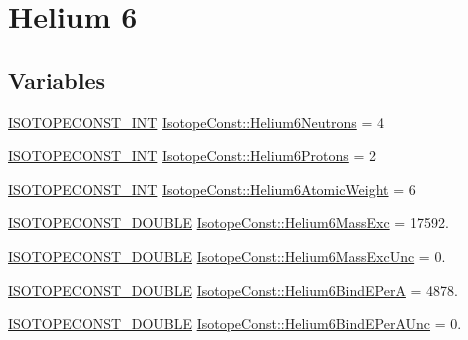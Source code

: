 \hypertarget{group___isotope_const-_helium-_he6}{}\section{Helium 6}
\label{group___isotope_const-_helium-_he6}
\subsection*{Variables}
\begin{DoxyCompactItemize}
\item 
\mbox{\hyperlink{group___isotope_const-_macros_ga5f18360b3e99483a35c32d789e62621c}{I\+S\+O\+T\+O\+P\+E\+C\+O\+N\+S\+T\+\_\+\+I\+NT}} \mbox{\hyperlink{group___isotope_const-_helium-_he6_ga86f644d7cf011f88558f20e694b5bb42}{Isotope\+Const\+::\+Helium6\+Neutrons}} = 4
\item 
\mbox{\hyperlink{group___isotope_const-_macros_ga5f18360b3e99483a35c32d789e62621c}{I\+S\+O\+T\+O\+P\+E\+C\+O\+N\+S\+T\+\_\+\+I\+NT}} \mbox{\hyperlink{group___isotope_const-_helium-_he6_ga706c09ca58fe4a6ffa5f1e9805d38a6a}{Isotope\+Const\+::\+Helium6\+Protons}} = 2
\item 
\mbox{\hyperlink{group___isotope_const-_macros_ga5f18360b3e99483a35c32d789e62621c}{I\+S\+O\+T\+O\+P\+E\+C\+O\+N\+S\+T\+\_\+\+I\+NT}} \mbox{\hyperlink{group___isotope_const-_helium-_he6_ga91ca6cd6a13ee8bc9603870270044db0}{Isotope\+Const\+::\+Helium6\+Atomic\+Weight}} = 6
\item 
\mbox{\hyperlink{group___isotope_const-_macros_ga8f45a7272ce02c0b4c65c44636ed719a}{I\+S\+O\+T\+O\+P\+E\+C\+O\+N\+S\+T\+\_\+\+D\+O\+U\+B\+LE}} \mbox{\hyperlink{group___isotope_const-_helium-_he6_gacd71416b87445729b29ff77bfbc806e5}{Isotope\+Const\+::\+Helium6\+Mass\+Exc}} = 17592.
\item 
\mbox{\hyperlink{group___isotope_const-_macros_ga8f45a7272ce02c0b4c65c44636ed719a}{I\+S\+O\+T\+O\+P\+E\+C\+O\+N\+S\+T\+\_\+\+D\+O\+U\+B\+LE}} \mbox{\hyperlink{group___isotope_const-_helium-_he6_ga28805a492d89f4fbf6d8732c76f93838}{Isotope\+Const\+::\+Helium6\+Mass\+Exc\+Unc}} = 0.
\item 
\mbox{\hyperlink{group___isotope_const-_macros_ga8f45a7272ce02c0b4c65c44636ed719a}{I\+S\+O\+T\+O\+P\+E\+C\+O\+N\+S\+T\+\_\+\+D\+O\+U\+B\+LE}} \mbox{\hyperlink{group___isotope_const-_helium-_he6_gabf28d69da886bab011ba74c62dc3062b}{Isotope\+Const\+::\+Helium6\+Bind\+E\+PerA}} = 4878.
\item 
\mbox{\hyperlink{group___isotope_const-_macros_ga8f45a7272ce02c0b4c65c44636ed719a}{I\+S\+O\+T\+O\+P\+E\+C\+O\+N\+S\+T\+\_\+\+D\+O\+U\+B\+LE}} \mbox{\hyperlink{group___isotope_const-_helium-_he6_gabb8237587291c453fefdd155b1206458}{Isotope\+Const\+::\+Helium6\+Bind\+E\+Per\+A\+Unc}} = 0.

\end{DoxyCompactItemize}
